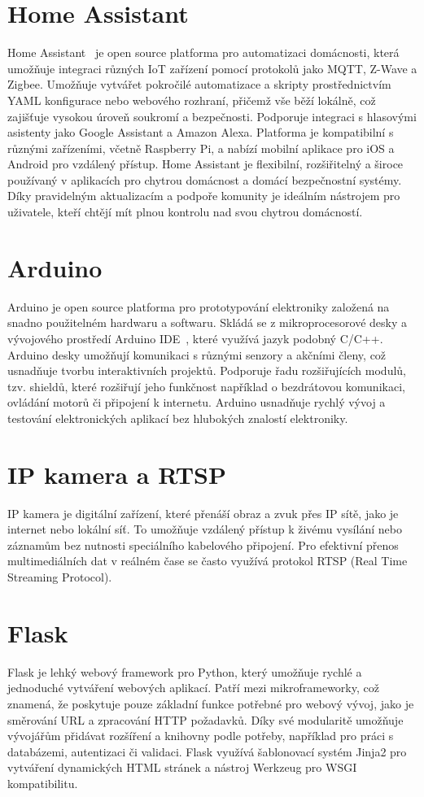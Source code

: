 \section{Home Assistant}\label{sec:home-assistant}
Home Assistant~\cite{co-je-to-ha} je open source platforma pro automatizaci domácnosti, která umožňuje integraci různých IoT zařízení pomocí protokolů jako MQTT, Z-Wave a Zigbee.
Umožňuje vytvářet pokročilé automatizace a skripty prostřednictvím YAML konfigurace nebo webového rozhraní, přičemž vše běží lokálně, což zajišťuje vysokou úroveň soukromí a bezpečnosti.
Podporuje integraci s hlasovými asistenty jako Google Assistant a Amazon Alexa.
Platforma je kompatibilní s různými zařízeními, včetně Raspberry Pi, a nabízí mobilní aplikace pro iOS a Android pro vzdálený přístup.
Home Assistant je flexibilní, rozšiřitelný a široce používaný v aplikacích pro chytrou domácnost a domácí bezpečnostní systémy.
Díky pravidelným aktualizacím a podpoře komunity je ideálním nástrojem pro uživatele, kteří chtějí mít plnou kontrolu nad svou chytrou domácností.

\section{Arduino}\label{sec:arduino}
Arduino je open source platforma pro prototypování elektroniky založená na snadno použitelném hardwaru a softwaru.
Skládá se z mikroprocesorové desky a vývojového prostředí Arduino IDE~\cite{arduino-ide}, které využívá jazyk podobný C/C++.
Arduino desky umožňují komunikaci s různými senzory a akčními členy, což usnadňuje tvorbu interaktivních projektů.
Podporuje řadu rozšiřujících modulů, tzv. shieldů, které rozšiřují jeho funkčnost například o bezdrátovou komunikaci, ovládání motorů či připojení k internetu.
Arduino usnadňuje rychlý vývoj a testování elektronických aplikací bez hlubokých znalostí elektroniky.

\section{IP kamera a RTSP}\label{sec:ipcamera-rtsp}
IP kamera je digitální zařízení, které přenáší obraz a zvuk přes IP sítě, jako je internet nebo lokální síť.
To umožňuje vzdálený přístup k živému vysílání nebo záznamům bez nutnosti speciálního kabelového připojení.
Pro efektivní přenos multimediálních dat v reálném čase se často využívá protokol RTSP (Real Time Streaming Protocol).

\section{Flask}\label{sec:flask}
Flask je lehký webový framework pro Python, který umožňuje rychlé a jednoduché vytváření webových aplikací.
Patří mezi mikroframeworky, což znamená, že poskytuje pouze základní funkce potřebné pro webový vývoj, jako je směrování URL a zpracování HTTP požadavků.
Díky své modularitě umožňuje vývojářům přidávat rozšíření a knihovny podle potřeby, například pro práci s databázemi, autentizaci či validaci.
Flask využívá šablonovací systém Jinja2 pro vytváření dynamických HTML stránek a nástroj Werkzeug pro WSGI kompatibilitu.


